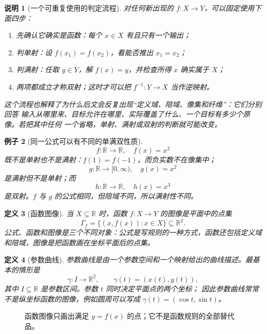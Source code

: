 \documentclass[UTF8,fontset=none,a4paper,11pt]{ctexart}
\theoremstyle{foundation-definition}
\newtheorem{definition}{定义}[section]
\theoremstyle{foundation-theorem}
\theoremstyle{foundation-proposition}
\theoremstyle{foundation-example}
\newtheorem{example}[definition]{例子}
\theoremstyle{foundation-remark}
\newtheorem{remark}[definition]{说明}
\theoremstyle{foundation-theorem}
\begin{document}
\begin{remark}[一个可重复使用的判定流程]
对任何新出现的 \(f:X\to Y\)，可以固定使用下面四步：

\begin{enumerate}[label=\arabic*.]
  \item 先确认它确实是函数：每个 \(x\in X\) 有且只有一个输出；
  \item 判单射：设 \(f(x_1)=f(x_2)\)，看能否推出 \(x_1=x_2\)；
  \item 判满射：任取 \(y\in Y\)，解 \(f(x)=y\)，并检查所得 \(x\) 确实属于 \(X\)；
  \item 两项都成立才称双射；这时才可以把 \(f^{-1}:Y\to X\) 当作逆映射。
\end{enumerate}

这个流程也解释了为什么后文会反复出现“定义域、陪域、像集和纤维”：它们分别回答
输入从哪里来、目标允许在哪里、实际覆盖了什么、一个目标有多少个原像。若把其中任何
一个省略，单射、满射或双射的判断就可能改变。
\end{remark}

\begin{example}[同一公式可以有不同的单满双性质]
\[
f:\mathbb R\to\mathbb R,\quad f(x)=x^2
\]
既不是单射也不是满射：\(f(1)=f(-1)\)，而负实数不在像集中；
\[
g:\mathbb R\to[0,\infty),\quad g(x)=x^2
\]
是满射但不是单射；而
\[
h:\mathbb R\to\mathbb R,\quad h(x)=x^3
\]
是双射。\(f\) 与 \(g\) 的公式相同，但陪域不同，所以满射性不同。
\end{example}

\begin{definition}[函数图像]\label{def:function-graph}
当 \(X\subseteq\mathbb R\) 时，函数 \(f:X\to Y\) 的图像是平面中的点集
\[
\Gamma_f=\{(x,f(x)):x\in X\}\subseteq\mathbb R^2.
\]
公式、函数和图像是三个不同对象：公式是写规则的一种方式，函数还包括定义域和陪域，图像是把函数画在坐标平面后的点集。
\end{definition}

\begin{definition}[参数曲线]\label{def:parametric-curve}
参数曲线是由一个参数空间和一个映射给出的曲线描述。最基本的情形是
\[
\gamma:I\longrightarrow\mathbb R^2,
\qquad
\gamma(t)=(x(t),y(t)),
\]
其中 \(I\subseteq\mathbb R\) 是参数区间。参数 \(t\) 同时决定平面点的两个坐标；
因此参数曲线常常不是纵坐标函数的图像，例如圆周可以写成
\(\gamma(t)=(\cos t,\sin t)\)。
\end{definition}

\begin{figure}[htbp]
\centering
{}
\caption{函数图像只画出满足 \(y=f(x)\) 的点；它不是函数规则的全部替代品。}
\label{fig:function-graph}
\end{figure}
\end{document}
